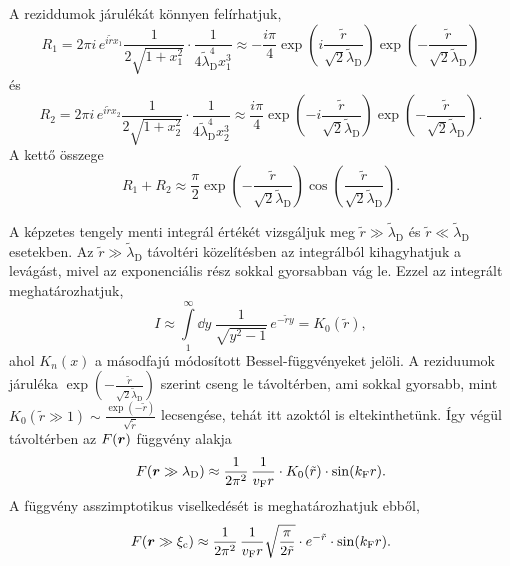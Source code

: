 \documentclass[a4paper,12pt,titlepage]{article}
\newcommand{\RR}{{\vb*{r}}}
\newcommand{\kF}{{k_\text{F}}}
\newcommand{\vF}{{v_\text{F}}}
\newcommand{\xic}{{\xi_\text{c}}}
\begin{document}
A reziddumok járulékát könnyen felírhatjuk,
\begin{equation}
	R_1 = 2 \pi i \, e^{i \tilde{r} x_1} \frac{1}{2 \sqrt{1 + x_1^2}} \cdot \frac{1}{4 \tilde{\lambda}_\text{D}^4 x_1^3} \approx -\frac{i \pi}{4} \exp(i \frac{\tilde{r}}{\sqrt{2} \tilde{\lambda}_\text{D}}) \exp(-\frac{\tilde{r}}{\sqrt{2} \tilde{\lambda}_\text{D}})
\end{equation}
és
\begin{equation}
	R_2 = 2 \pi i \, e^{i \tilde{r} x_2} \frac{1}{2 \sqrt{1 + x_2^2}} \cdot \frac{1}{4 \tilde{\lambda}_\text{D}^4 x_2^3} \approx \frac{i \pi}{4} \exp(-i \frac{\tilde{r}}{\sqrt{2} \tilde{\lambda}_\text{D}}) \exp(-\frac{\tilde{r}}{\sqrt{2} \tilde{\lambda}_\text{D}}).
\end{equation}
A kettő összege
\begin{equation}
	R_1 + R_2 \approx \frac{\pi}{2} \exp(-\frac{\tilde{r}}{\sqrt{2} \tilde{\lambda}_\text{D}}) \cos(\frac{\tilde{r}}{\sqrt{2} \tilde{\lambda}_\text{D}}).
\end{equation}

A képzetes tengely menti integrál értékét vizsgáljuk meg $\tilde{r} \gg \tilde{\lambda}_\text{D}$ és $\tilde{r} \ll \tilde{\lambda}_\text{D}$ esetekben.  Az $\tilde{r} \gg \tilde{\lambda}_\text{D}$ távoltéri közelítésben az integrálból kihagyhatjuk a levágást, mivel az exponenciális rész sokkal gyorsabban vág le.  Ezzel az integrált meghatározhatjuk,
\begin{equation}
	I \approx \int\limits_1^\infty \dd{y} ~ \frac{1}{\sqrt{y^2 - 1}} \, e^{-\tilde{r} y} = K_0(\tilde{r}),
\end{equation}
ahol $K_n(x)$ a másodfajú módosított Bessel-függvényeket jelöli.  A reziduumok járuléka $\exp(-\frac{\tilde{r}}{\sqrt{2} \tilde{\lambda}_\text{D}})$ szerint cseng le távoltérben, ami sokkal gyorsabb, mint $K_0(\tilde{r} \gg 1) \sim \frac{\exp(-\tilde{r})}{\sqrt{\tilde{r}}}$ lecsengése, tehát itt azoktól is eltekinthetünk.  Így végül távoltérben az $F(\RR)$ függvény alakja
\begin{equation}
	F(\RR \gg \lambda_\text{D}) \approx \frac{1}{2 \pi^2} \, \frac{1}{\vF r} \cdot K_0(\tilde{r}) \cdot \sin(\kF r).
\end{equation}
A függvény asszimptotikus viselkedését is meghatározhatjuk ebből,
\begin{equation}
	F(\RR \gg \xic) \approx \frac{1}{2 \pi^2} \, \frac{1}{\vF r} \sqrt{\frac{\pi}{2 \tilde{r}}} \cdot e^{-\tilde{r}} \cdot \sin(\kF r).
\end{equation}
\end{document}
